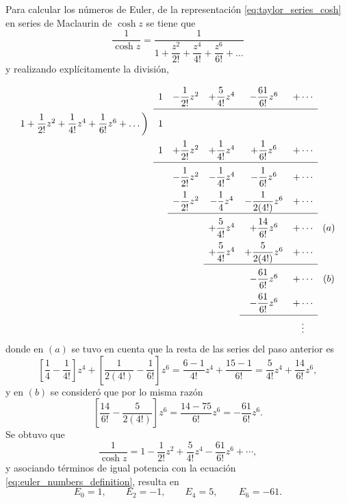 \documentclass[a4paper]{report}
\begin{document}
Para calcular los números de Euler, de la representación \ref{eq:taylor_series_cosh} en series de Maclaurin de \(\cosh z\) se tiene que 
\[
 \frac{1}{\cosh z}=\dfrac{1}{1+\dfrac{z^2}{2!}+\dfrac{z^4}{4!}+\dfrac{z^6}{6!}+\dots}
\]
y realizando explícitamente la división,
\[
\setlength\extrarowheight{10pt}
\begin{array}[t]{ccccccc}
                       & 1  & -\dfrac{1}{2!}z^2 & +\dfrac{5}{4!}z^4 & -\dfrac{61}{6!}z^6 & +\cdots&\\[\medskipamount]
\cline{2-6}
1+\dfrac{1}{2!}z^2+\dfrac{1}{4!}z^4+\dfrac{1}{6!}z^6+\dots\bigg)  
                       & 1  & &  &  &  &\\
                       & 1  & +\dfrac{1}{2!}z^2 & +\dfrac{1}{4!}z^4 & +\dfrac{1}{6!}z^6 & +\cdots&\\[\medskipamount]
\cline{2-6}
                       &    & -\dfrac{1}{2!}z^2 & -\dfrac{1}{4!}z^4 & -\dfrac{1}{6!}z^6 & +\cdots&\\
                       &    & -\dfrac{1}{2!}z^2 & -\dfrac{1}{4}z^4 & -\dfrac{1}{2(4!)}z^6 & +\cdots&\\[\medskipamount]
\cline{3-6}
                       &    &                & +\dfrac{5}{4!}z^4 & +\dfrac{14}{6!}z^6 & +\cdots&(a)\\
                       &    &                & +\dfrac{5}{4!}z^4 & +\dfrac{5}{2(4!)}z^6 & +\cdots&\\[\medskipamount]
\cline{4-6}
                       &    &                &                   & -\dfrac{61}{6!}z^6 & +\cdots&(b)\\
                       &    &                &                   & -\dfrac{61}{6!}z^6 & +\cdots&\\[\medskipamount]
\cline{5-6}
                       &    &                &                   &  & \vdots&
\end{array}
\]
donde en \((a)\) se tuvo en cuenta que la resta de las series del paso anterior es
\[
 \left[\frac{1}{4}-\frac{1}{4!}\right]z^4+\left[\frac{1}{2(4!)}-\frac{1}{6!}\right]z^6=
 \frac{6-1}{4!}z^4+\frac{15-1}{6!}=\dfrac{5}{4!}z^4+\dfrac{14}{6!}z^6, 
\]
y en \((b)\) se consideró que por lo misma razón 
\[
 \left[\frac{14}{6!}-\frac{5}{2(4!)}\right]z^6=\frac{14-75}{6!}z^6=-\frac{61}{6!}z^6.
\]
Se obtuvo que 
\[
 \frac{1}{\cosh z}=1-\frac{1}{2!}z^2+\dfrac{5}{4!}z^4-\dfrac{61}{6!}z^6+\cdots,
\]
y asociando términos de igual potencia con la ecuación \ref{eq:euler_numbers_definition}, resulta en
\[
 E_0=1,\qquad 
 E_2=-1,\qquad 
 E_4=5,\,\qquad 
 E_6=-61.
\]
\end{document}
